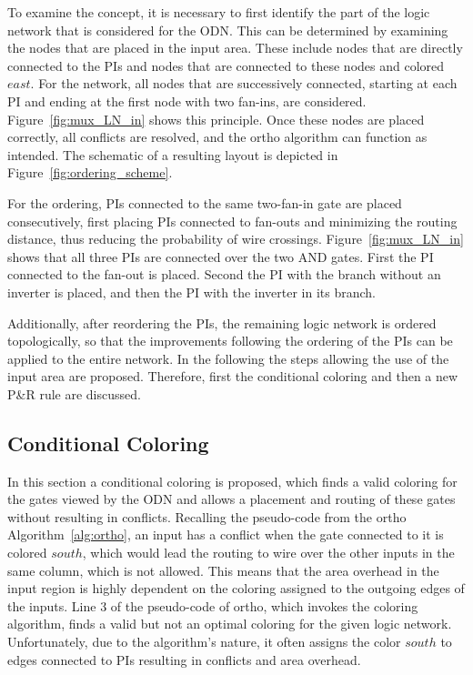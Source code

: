 To examine the concept, it is necessary to first identify the part of the logic network that is considered for the ODN. This can be determined by examining the nodes that are placed in the input area. These include nodes that are directly connected to the PIs and nodes that are connected to these nodes and colored $east$. For the network, all nodes that are successively connected, starting at each PI and ending at the first node with two fan-ins, are considered. Figure~\ref{fig:mux_LN_in} shows this principle. Once these nodes are placed correctly, all conflicts are resolved, and the ortho algorithm can function as intended. The schematic of a resulting layout is depicted in Figure~\ref{fig:ordering_scheme}.

For the ordering, PIs connected to the same two-fan-in gate are placed consecutively, first placing PIs connected to fan-outs and minimizing the routing distance, thus reducing the probability of wire crossings. Figure~\ref{fig:mux_LN_in} shows that all three PIs are connected over the two AND gates. First the PI connected to the fan-out is placed. Second the PI with the branch without an inverter is placed, and then the PI with the inverter in its branch.

Additionally, after reordering the PIs, the remaining logic network is ordered topologically, so that the improvements following the ordering of the PIs can be applied to the entire network. In the following the steps allowing the use of the input area are proposed. Therefore, first the conditional coloring and then a new P\&R rule are discussed.

\subsection{Conditional Coloring}\label{subsec:coco}

In this section a conditional coloring is proposed, which finds a valid coloring for the gates viewed by the ODN and allows a placement and routing of these gates without resulting in conflicts. Recalling the pseudo-code from the ortho Algorithm~\ref{alg:ortho}, an input has a conflict when the gate connected to it is colored $south$, which would lead the routing to wire over the other inputs in the same column, which is not allowed. This means that the area overhead in the input region is highly dependent on the coloring assigned to the outgoing edges of the inputs. Line $3$ of the pseudo-code of ortho, which invokes the coloring algorithm, finds a valid but not an optimal coloring for the given logic network. Unfortunately, due to the algorithm's nature, it often assigns the color $south$ to edges connected to PIs resulting in conflicts and area overhead.

